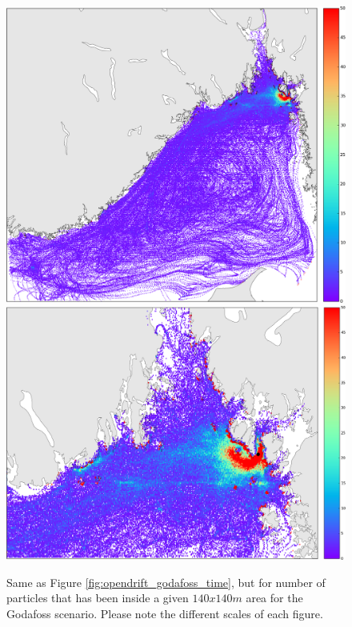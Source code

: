 \begin{figure}[ht]
\centerline{
\includegraphics*[width=.5\textwidth]{Figurer/opendrift/opendrift_godafoss_consentration_crop}
\includegraphics*[width=.5\textwidth]{Figurer/opendrift/opendrift_godafoss_consentration_zoom_crop}
}
\caption{\small
Same as Figure \ref{fig:opendrift_godafoss_time}, but for number of particles that has been inside a given $140x140m$ area for the Godafoss scenario. Please note the different scales of each figure.}
\label{fig:opendrift_godafoss_conc}
\end{figure}

